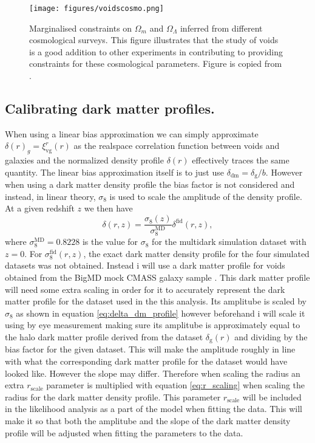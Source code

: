 \begin{figure}
    \texttt{[image: figures/voidscosmo.png]}
    \caption{Marginalised constraints on $\Omega_m$ and $\Omega_\Lambda$ inferred from different cosmological surveys. This figure illustrates that the study of voids is a good addition to other experiments in contributing to providing constraints for these cosmological parameters. Figure is copied from \cite{Nadathur_2020}.}
    \label{fig:voidscosmoparam}
\end{figure}
\subsection{Calibrating dark matter profiles.}\label{sec:dm_calibrate}
When using a linear bias approximation we can simply approximate $\delta(r)_g=\xi_{\mathrm{vg}}^r(r)$ as the realspace correlation function between voids and galaxies and the normalized density profile $\delta(r)$ effectively traces the same quantity. The linear bias approximation itself is to just use $\delta_{\mathrm{dm}}=\delta_\mathrm{g}/b$. However when using a dark matter density profile the bias factor is not considered and instead, in linear theory, $\sigma_8$ is used to scale the amplitude of the density profile. At a given redshift $z$ we then have
\begin{equation}\label{eq:delta_dm_profile}
    \delta(r,z) = \frac{\sigma_8(z)}{\sigma_8^{\mathrm{MD}}}\delta^\mathrm{fid}(r,z),
\end{equation}
where $\sigma_8^{\mathrm{MD}}=0.8228$ is the value for $\sigma_8$ for the multidark simulation dataset with $z=0$. For $\sigma_8^\mathrm{fid}(r,z)$, the exact dark matter density profile for the four simulated datasets was not obtained. Instead i will use a dark matter profile for voids obtained from the BigMD mock CMASS galaxy sample \cite{Dawson_2012}. This dark matter profile will need some extra scaling in order for it to accurately represent the dark matter profile for the dataset used in the this analysis. Its amplitube is scaled by $\sigma_8$ as shown in equation \ref{eq:delta_dm_profile} however beforehand i will scale it using by eye measurement making sure its amplitube is approximately equal to the halo dark matter profile derived from the dataset $\delta_\mathrm{g}(r)$ and dividing by the bias factor for the given dataset. This will make the amplitude roughly in line with what the corresponding dark matter profile for the dataset would have looked like. However the slope may differ. Therefore when scaling the radius an extra $r_\mathrm{scale}$ parameter is multiplied with equation \ref{eq:r_scaling} when scaling the radius for the dark matter density profile. This parameter $r_\mathrm{scale}$ will be included in the likelihood analysis as a part of the model when fitting the data. This will make it so that both the amplitube and the slope of the dark matter density profile will be adjusted when fitting the parameters to the data.
